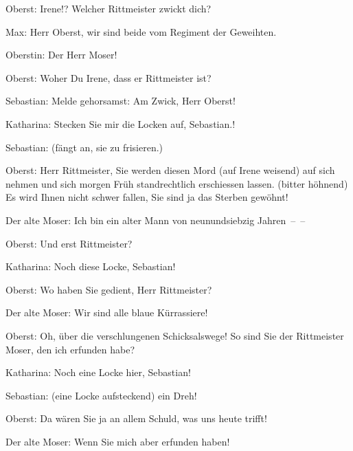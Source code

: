 \pstart
           Oberst: Irene!? Welcher Rittmeister zwickt dich?\pend
           
\pstart
           Max: Herr Oberst, wir sind beide vom Regiment der Geweihten.\pend
           
\pstart
           Oberstin: Der Herr Moser!\pend
           
\pstart
           Oberst: Woher \label{T_L01900-2v}\label{T_L01900-2} Du Irene, dass er Rittmeister ist?\pend
           
\pstart
           Sebastian: Melde gehorsamst: Am Zwick, Herr Oberst!\pend
           
\pstart
           Katharina: Stecken Sie mir die Locken auf, Sebastian.!\pend
           
\pstart
           Sebastian: (fängt an, sie zu frisieren.)\pend
           
\pstart
           Oberst: Herr Rittmeister, Sie werden diesen Mord (auf Irene weisend) auf sich nehmen
               und sich morgen Früh standrechtlich erschiessen lassen. (bitter höhnend) Es wird
               Ihnen nicht schwer fallen, Sie sind ja das Sterben gewöhnt!\pend
           
\pstart
           Der alte Moser: Ich bin ein alter Mann von neunundsiebzig Jahren – –\pend
           
\pstart
           {\pb}Oberst: Und erst Rittmeister?\pend
           
\pstart
           Katharina: Noch diese Locke, Sebastian!\pend
           
\pstart
           Oberst: Wo haben Sie gedient, Herr Rittmeister?\pend
           
\pstart
           Der alte Moser: Wir sind alle blaue Kürrassiere!\pend
           
\pstart
           Oberst: Oh, über die verschlungenen Schicksalswege! So sind Sie der Rittmeister
               Moser, den ich erfunden habe?\pend
           
\pstart
           Katharina: Noch eine Locke hier, Sebastian!\pend
           
\pstart
           Sebastian: (eine Locke aufsteckend)  ein Dreh!\pend
           
\pstart
           Oberst: Da wären Sie ja an allem Schuld, was uns heute trifft!\pend
           
\pstart
           \introOben{}\introOben{}Der alte Moser: Wenn Sie mich aber erfunden haben!\pend
           
